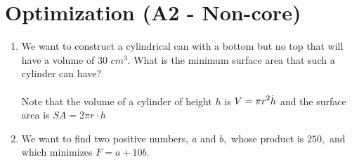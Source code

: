 \documentclass[10pt]{article}
\begin{document}
 \section{Optimization (A2 - Non-core)} 
 \begin{enumerate}
     \item We want to construct a cylindrical can with a bottom but no top that will have a volume of 30 $cm^3$. What is the minimum surface area that such a cylinder can have? \\\\Note that the volume of a cylinder of height $h$ is $\displaystyle V=\pi r^2\dot h$ and the surface area  is $SA=2\pi r\cdot h$
     \vfill
     \item We want to find two positive numbers, $a$ and $b,$ whose product is $250,$ and which minimizes $F=a + 10b.$
     \vfill
 \end{enumerate}
\end{document}
